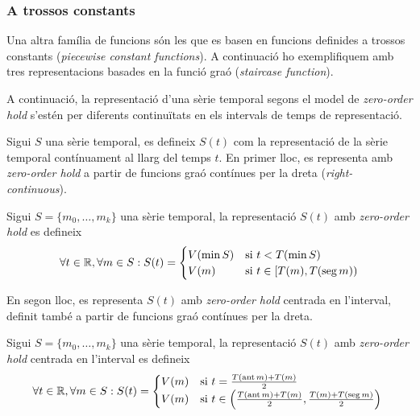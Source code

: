 \subsubsection{A trossos constants}

Una altra família de funcions són les que es basen en funcions
definides a trossos constants (\emph{piecewise constant functions}).
A continuació ho exemplifiquem amb tres representacions basades en la
funció graó (\emph{staircase function}).




\todo{}






A continuació,  la representació  d'una sèrie temporal segons el model de \emph{zero-order hold} s'estén per diferents continuïtats en els intervals de temps de representació.

Sigui $S$ una sèrie temporal, es defineix $S(t)$ com la representació
de la sèrie temporal contínuament al llarg del temps $t$.  En primer
lloc, es representa amb \emph{zero-order hold} a partir de funcions
graó contínues per la dreta (\emph{right-continuous}).

\begin{definition}
Sigui $S=\{m_0,\ldots,m_k\}$ una sèrie temporal, la representació  $S(t)$ amb \emph{zero-order hold} es defineix
\[
\forall t \in \mathbb{R} ,\forall m \in S: S(t) =
\begin{cases}
  V(\min S) & \text{si } t < T(\min S) \\
  V(m) & \text{si }  t\in [T(m),T(\operatorname*{seg} m))
\end{cases}
\]
\end{definition}

En segon lloc, es representa $S(t)$ amb \emph{zero-order hold} centrada en
l'interval, definit també a partir de funcions graó contínues per la
dreta.

\begin{definition}
  Sigui $S=\{m_0,\ldots,m_k\}$ una sèrie temporal, la representació
  $S(t)$ amb \emph{zero-order hold} centrada en l'interval es defineix
\[
\forall t \in \mathbb{R}  ,\forall m \in S:
S(t) =  
\begin{cases}
  V(m) & \text{si } t = \frac{T(\operatorname*{ant} m)+T(m)}{2} \\
  V(m) & \text{si } t\in \left( \frac{T(\operatorname*{ant} m)+T(m)}{2},\frac{T(m)+T(\operatorname*{seg} m)}{2} \right) \
\end{cases}
\]
\end{definition}



